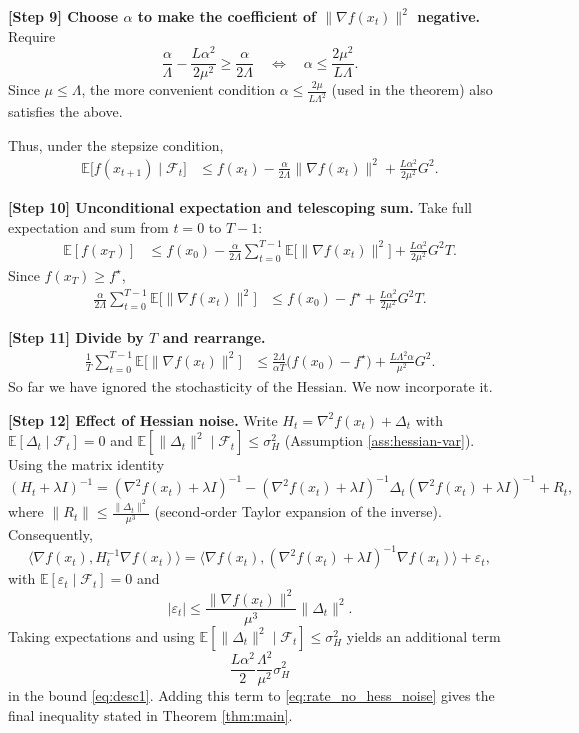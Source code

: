 \documentclass{article}
\begin{document}
\noindent\textbf{[Step 9] Choose $\alpha$ to make the coefficient of $\|\nabla f(x_{t})\|^{2}$ negative.}  
Require
\[
\frac{\alpha}{\Lambda}-\frac{L\alpha^{2}}{2\mu^{2}}\ge\frac{\alpha}{2\Lambda}
\quad\Longleftrightarrow\quad
\alpha\le\frac{2\mu^{2}}{L\Lambda}.
\]
Since $\mu\le\Lambda$, the more convenient condition $\alpha\le\frac{2\mu}{L\Lambda^{2}}$ (used in the theorem) also satisfies the above.

Thus, under the stepsize condition,
\begin{align}
\mathbb{E}\!\big[f(x_{t+1})\mid\mathcal{F}_{t}\big]
&\le f(x_{t})
-\frac{\alpha}{2\Lambda}\|\nabla f(x_{t})\|^{2}
+\frac{L\alpha^{2}}{2\mu^{2}}G^{2}. \label{eq:desc1}
\end{align}

\noindent\textbf{[Step 10] Unconditional expectation and telescoping sum.}  
Take full expectation and sum from $t=0$ to $T-1$:
\begin{align}
\mathbb{E}[f(x_{T})]
&\le f(x_{0})
-\frac{\alpha}{2\Lambda}\sum_{t=0}^{T-1}\mathbb{E}\!\big[\|\nabla f(x_{t})\|^{2}\big]
+\frac{L\alpha^{2}}{2\mu^{2}}G^{2}T. \label{eq:telesc}
\end{align}
Since $f(x_{T})\ge f^{\star}$,
\begin{align}
\frac{\alpha}{2\Lambda}\sum_{t=0}^{T-1}\mathbb{E}\!\big[\|\nabla f(x_{t})\|^{2}\big]
&\le f(x_{0})-f^{\star}
+\frac{L\alpha^{2}}{2\mu^{2}}G^{2}T. \label{eq:pre_rate}
\end{align}

\noindent\textbf{[Step 11] Divide by $T$ and rearrange.}
\begin{align}
\frac{1}{T}\sum_{t=0}^{T-1}\mathbb{E}\!\big[\|\nabla f(x_{t})\|^{2}\big]
&\le \frac{2\Lambda}{\alpha T}\big(f(x_{0})-f^{\star}\big)
+\frac{L\Lambda^{2}\alpha}{\mu^{2}}G^{2}. \label{eq:rate_no_hess_noise}
\end{align}
So far we have ignored the stochasticity of the Hessian. We now incorporate it.

\noindent\textbf{[Step 12] Effect of Hessian noise.}  
Write $H_{t}= \nabla^{2}f(x_{t})+ \Delta_{t}$ with $\mathbb{E}[\Delta_{t}\mid\mathcal{F}_{t}]=0$ and $\mathbb{E}[\|\Delta_{t}\|^{2}\mid\mathcal{F}_{t}]\le\sigma_{H}^{2}$ (Assumption \ref{ass:hessian-var}).  
Using the matrix identity
\[
(H_{t}+\lambda I)^{-1}
= (\nabla^{2}f(x_{t})+\lambda I)^{-1}
- (\nabla^{2}f(x_{t})+\lambda I)^{-1}\Delta_{t}(\nabla^{2}f(x_{t})+\lambda I)^{-1}+R_{t},
\]
where $\|R_{t}\| \le \frac{\|\Delta_{t}\|^{2}}{\mu^{3}}$ (second‑order Taylor expansion of the inverse).  
Consequently,
\[
\langle \nabla f(x_{t}), H_{t}^{-1}\nabla f(x_{t})\rangle
= \langle \nabla f(x_{t}), (\nabla^{2}f(x_{t})+\lambda I)^{-1}\nabla f(x_{t})\rangle
+ \varepsilon_{t},
\]
with $\mathbb{E}[\varepsilon_{t}\mid\mathcal{F}_{t}]=0$ and
\[
|\varepsilon_{t}|\le \frac{\|\nabla f(x_{t})\|^{2}}{\mu^{3}}\|\Delta_{t}\|^{2}.
\]
Taking expectations and using $\mathbb{E}[\|\Delta_{t}\|^{2}\mid\mathcal{F}_{t}]\le\sigma_{H}^{2}$ yields an additional term
\[
\frac{L\alpha^{2}}{2}\frac{\Lambda^{2}}{\mu^{2}}\sigma_{H}^{2}
\]
in the bound \eqref{eq:desc1}. Adding this term to \eqref{eq:rate_no_hess_noise} gives the final inequality stated in Theorem \ref{thm:main}.
\end{document}
